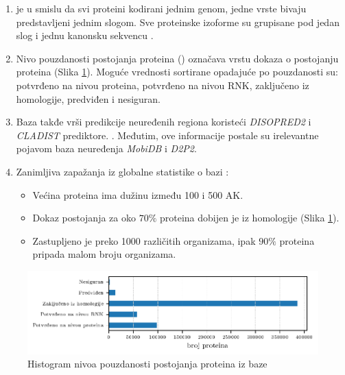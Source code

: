 \begin{enumerate}
  \item
    \label{red}
    \swissprot je  u smislu da svi proteini
    kodirani jednim genom, jedne vrste bivaju predstavljeni jednim slogom. Sve
    proteinske izoforme su grupisane pod jedan slog i jednu kanonsku sekvencu \parencite{nonRedundant}.

  \item Nivo pouzdanosti postojanja proteina () 
    označava vrstu dokaza o postojanju proteina (Slika \ref{fig:PE}). Moguće
    vrednosti sortirane opadajuće po pouzdanosti su: potvrđeno na nivou
    proteina, potvrđeno na nivou RNK, zaključeno iz homologije, predviđen i
    nesiguran. 

  \clearpage


  \item
    Baza \swissprot takđe vrši predikcije neuređenih regiona koristeći \textit{DISOPRED2}
    i \textit{CLADIST} prediktore. \parencite{Meng_c2017}. Međutim, ove informacije
    postale su irelevantne pojavom baza neuređenja \textit{MobiDB}\parencite{Piovesan2017} i \textit{D2P2}\parencite{Oates2012}.

  \item Zanimljiva zapažanja iz globalne statistike o bazi \swissprot \cite{uniprot}:
    \begin{itemize}
      \item Većina proteina ima dužinu između 100 i 500 AK.
      \item Dokaz postojanja za oko $70\%$ proteina dobijen je iz homologije (Slika \ref{fig:PE}).
      \item Zastupljeno je preko 1000 različitih organizama, ipak
        $90\%$ proteina pripada malom broju organizama.
    \end{itemize}
      


\end{enumerate}

\begin{figure}[h!]
  \centering
  \hspace*{-0.2cm} 
  \includegraphics[]{plots/PE.pdf}
  \caption{Histogram nivoa pouzdanosti postojanja proteina iz baze \swissprot}
  \label{fig:PE}
\end{figure}

%
%
%













